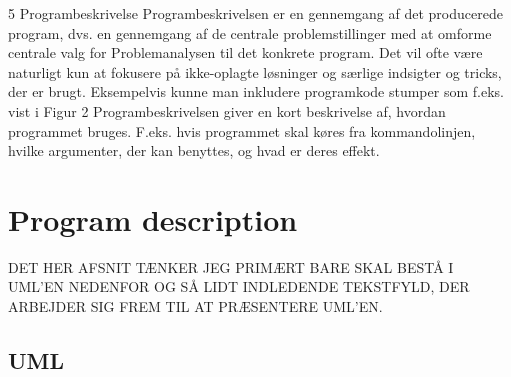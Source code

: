 \documentclass[a4paper]{report}
\begin{document}
5 Programbeskrivelse
Programbeskrivelsen er en gennemgang af det producerede program, dvs. en gennemgang af de centrale
problemstillinger med at omforme centrale valg for Problemanalysen til det konkrete program. Det vil
ofte være naturligt kun at fokusere på ikke-oplagte løsninger og særlige indsigter og tricks, der er brugt.
Eksempelvis kunne man inkludere programkode stumper som f.eks. vist i Figur 2
Programbeskrivelsen giver en kort beskrivelse af, hvordan programmet bruges. F.eks. hvis programmet
skal køres fra kommandolinjen, hvilke argumenter, der kan benyttes, og hvad er deres effekt.

\section*{Program description}

DET HER AFSNIT TÆNKER JEG PRIMÆRT BARE SKAL BESTÅ I UML'EN NEDENFOR OG SÅ LIDT INDLEDENDE TEKSTFYLD, DER ARBEJDER SIG FREM TIL AT PRÆSENTERE UML'EN.

\subsection*{UML}
\end{document}
